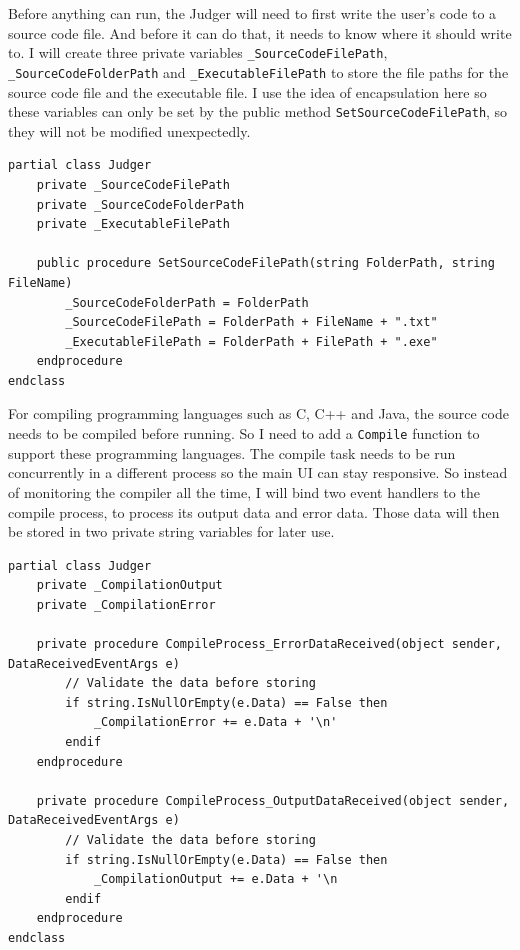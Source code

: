 \documentclass[a4paper]{report}
\begin{document}
Before anything can run, the Judger will need to first write the user's code to a source code file. And before it can do that, it needs to know where it should write to. I will create three private variables \texttt{_SourceCodeFilePath}, \texttt{_SourceCodeFolderPath} and \texttt{_ExecutableFilePath} to store the file paths for the source code file and the executable file. I use the idea of encapsulation here so these variables can only be set by the public method \texttt{SetSourceCodeFilePath}, so they will not be modified unexpectedly.

\begin{verbatim}
partial class Judger
    private _SourceCodeFilePath
    private _SourceCodeFolderPath
    private _ExecutableFilePath

    public procedure SetSourceCodeFilePath(string FolderPath, string FileName)
        _SourceCodeFolderPath = FolderPath
        _SourceCodeFilePath = FolderPath + FileName + ".txt"
        _ExecutableFilePath = FolderPath + FilePath + ".exe"
    endprocedure
endclass
\end{verbatim}

For compiling programming languages such as C, C++ and Java, the source code needs to be compiled before running. So I need to add a \texttt{Compile} function to support these programming languages. The compile task needs to be run concurrently in a different process so the main UI can stay responsive. So instead of monitoring the compiler all the time, I will bind two event handlers to the compile process, to process its output data and error data. Those data will then be stored in two private string variables for later use.

\begin{verbatim}
partial class Judger
    private _CompilationOutput
    private _CompilationError

    private procedure CompileProcess_ErrorDataReceived(object sender, DataReceivedEventArgs e)
        // Validate the data before storing
        if string.IsNullOrEmpty(e.Data) == False then
            _CompilationError += e.Data + '\n'
        endif
    endprocedure

    private procedure CompileProcess_OutputDataReceived(object sender, DataReceivedEventArgs e)
        // Validate the data before storing
        if string.IsNullOrEmpty(e.Data) == False then
            _CompilationOutput += e.Data + '\n
        endif
    endprocedure
endclass
\end{verbatim}
\end{document}
